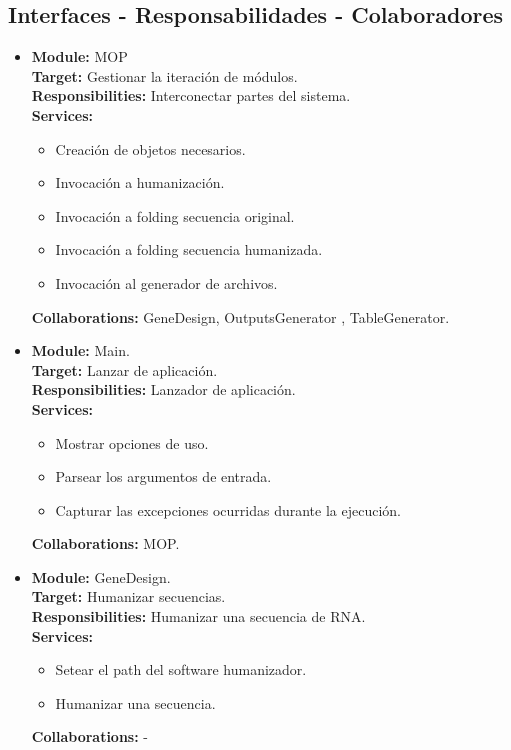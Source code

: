 \documentclass[12pt,a4paper,spanish]{article}
\begin{document}
\subsection{Interfaces - Responsabilidades - Colaboradores}
\begin{itemize}
    \item \textbf{Module:} MOP \\
    \textbf{Target:} Gestionar la iteración de módulos. \\
    \textbf{Responsibilities:} Interconectar partes del sistema. \\
    \textbf{Services:} 
        \begin{itemize}
            \item Creación de objetos necesarios.
            \item Invocación a humanización.
            \item Invocación a folding secuencia original.
            \item Invocación a folding secuencia humanizada.
            \item Invocación al generador de archivos.
        \end{itemize}
    \textbf{Collaborations:}	GeneDesign, OutputsGenerator , TableGenerator. \\

    \item \textbf{Module:} Main. \\
    \textbf{Target:} Lanzar de aplicación. \\
    \textbf{Responsibilities:} Lanzador de aplicación. \\
    \textbf{Services:}
        \begin{itemize}
            \item Mostrar opciones de uso.
            \item Parsear los argumentos de entrada.
            \item Capturar las excepciones ocurridas durante la ejecución.
        \end{itemize} 
    \textbf{Collaborations:} MOP. \\

    \item \textbf{Module:} GeneDesign. \\
    \textbf{Target:}  Humanizar secuencias. \\
    \textbf{Responsibilities:} Humanizar una secuencia de RNA. \\
    \textbf{Services:}
        \begin{itemize}
            \item Setear el path del software humanizador.
            \item Humanizar una secuencia.
        \end{itemize} 
    \textbf{Collaborations:}	- \\


\end{itemize}
\end{document}
